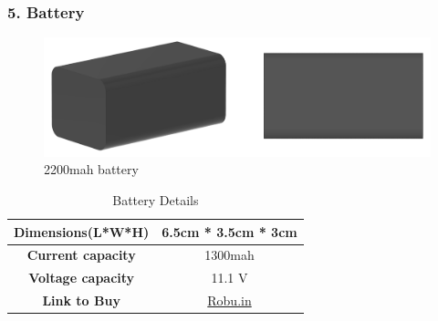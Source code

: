 \documentclass[12pt,a4paper,oneside]{book}
\begin{document}
			\subsubsection*{5. Battery}
				\begin{figure}[H]
					\centering					
					\includegraphics[scale=1]{BATTERY FULL}
					\caption{2200mah battery}	 
				\end{figure}
				\begin{table}[H]
					\centering
					\def\arraystretch{1.5}
					\caption{Battery Details}
					\vspace{0.5cm}
					\begin{tabular}{|c||c|}
						\hline
						\textbf{Dimensions(L*W*H)} & 6.5cm * 3.5cm * 3cm\\\hline
						\textbf{Current capacity} & 1300mah\\\hline
						\textbf{Voltage capacity} & 11.1 V\\\hline
						\textbf{Link to Buy} & \href{https://robu.in/product/orange-1300mah-4s-100c200c-lithium-polymer-battery-pack-lipo/}{Robu.in}\\\hline
					\end{tabular}
				\end{table}
				\pagebreak
				
\end{document}
